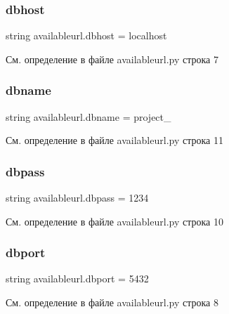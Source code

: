 \subsubsection{\texorpdfstring{dbhost}{dbhost}}
{\footnotesize\ttfamily string availableurl.\+dbhost = \textquotesingle{}localhost\textquotesingle{}}



См. определение в файле availableurl.\+py строка 7

\mbox{\label{namespaceavailableurl_ac13da61208e787ad038413b3779bf437}} 
\subsubsection{\texorpdfstring{dbname}{dbname}}
{\footnotesize\ttfamily string availableurl.\+dbname = \textquotesingle{}project\+\_\textquotesingle{}}



См. определение в файле availableurl.\+py строка 11

\mbox{\label{namespaceavailableurl_a213229dedd788b05a4d417a6e54d5662}} 
\subsubsection{\texorpdfstring{dbpass}{dbpass}}
{\footnotesize\ttfamily string availableurl.\+dbpass = \textquotesingle{}1234\textquotesingle{}}



См. определение в файле availableurl.\+py строка 10

\mbox{\label{namespaceavailableurl_a390f7a9e2e87f1ef981f38c17606925a}} 
\subsubsection{\texorpdfstring{dbport}{dbport}}
{\footnotesize\ttfamily string availableurl.\+dbport = \textquotesingle{}5432\textquotesingle{}}



См. определение в файле availableurl.\+py строка 8

